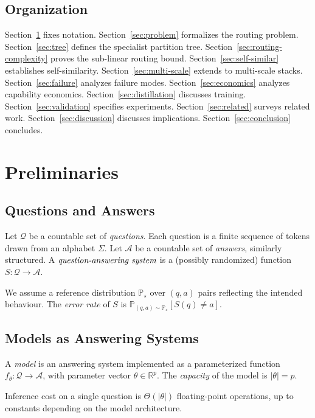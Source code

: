 \documentclass[11pt,a4paper]{article}
\theoremstyle{definition}
\theoremstyle{remark}
\newcommand{\R}{\mathbb{R}}
\renewcommand{\Pr}{\mathbb{P}}
\newcommand{\Qc}{\mathcal{Q}}
\begin{document}
\subsection{Organization}

Section~\ref{sec:preliminaries} fixes notation.
Section~\ref{sec:problem} formalizes the routing problem.
Section~\ref{sec:tree} defines the specialist partition tree.
Section~\ref{sec:routing-complexity} proves the sub-linear routing bound.
Section~\ref{sec:self-similar} establishes self-similarity.
Section~\ref{sec:multi-scale} extends to multi-scale stacks.
Section~\ref{sec:failure} analyzes failure modes.
Section~\ref{sec:economics} analyzes capability economics.
Section~\ref{sec:distillation} discusses training.
Section~\ref{sec:validation} specifies experiments.
Section~\ref{sec:related} surveys related work.
Section~\ref{sec:discussion} discusses implications.
Section~\ref{sec:conclusion} concludes.

\section{Preliminaries}
\label{sec:preliminaries}

\subsection{Questions and Answers}

Let $\Qc$ be a countable set of \emph{questions}. Each question is a finite sequence of tokens drawn from an alphabet $\Sigma$. Let $\mathcal{A}$ be a countable set of \emph{answers}, similarly structured. A $\emph{question-answering system}$ is a (possibly randomized) function $S: \Qc \to \mathcal{A}$.

We assume a reference distribution $\Pr_{\star}$ over $(q, a)$ pairs reflecting the intended behaviour. The \emph{error rate} of $S$ is $\Pr_{(q,a) \sim \Pr_{\star}}[S(q) \neq a]$.

\subsection{Models as Answering Systems}

A \emph{model} is an answering system implemented as a parameterized function $f_\theta: \Qc \to \mathcal{A}$, with parameter vector $\theta \in \R^p$. The \emph{capacity} of the model is $|\theta| = p$.

Inference cost on a single question is $\Theta(|\theta|)$ floating-point operations, up to constants depending on the model architecture.
\end{document}
